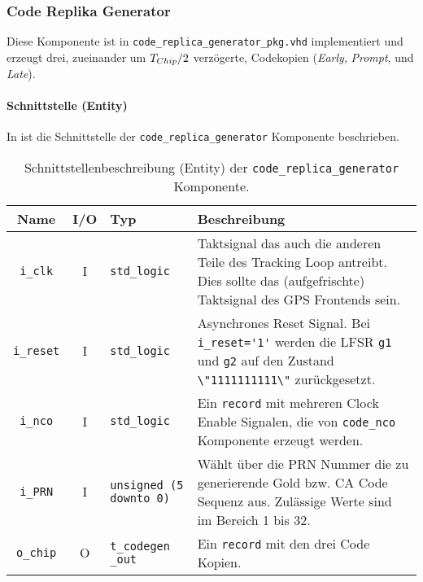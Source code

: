 \subsubsection{Code Replika Generator}
Diese Komponente ist in  \lstinline$code_replica_generator_pkg.vhd$ implementiert und erzeugt drei, zueinander um ${T}_{Chip} /2$ verzögerte, Codekopien (\emph{Early}, \emph{Prompt}, und \emph{Late}).

\paragraph{Schnittstelle (Entity)}
In  ist die Schnittstelle der \lstinline$code_replica_generator$ Komponente beschrieben.

\begin{table}[htbp]
    \ttabbox
    {
        \caption[Code Replika Generator Schnittstelle]{Schnittstellenbeschreibung (Entity) der \lstinline$code_replica_generator$ Komponente.}
        \label{TabCodeGen_Entity}
    }
    {
    \begin{tabular}{c c  p{2cm} p{6cm}}
        \toprule
        Name                    & I/O  & Typ                               & Beschreibung \\
        \midrule
        \lstinline$i_clk$       & I         & \lstinline$std_logic$             & Taktsignal das auch die anderen Teile des Tracking Loop antreibt. Dies sollte das (aufgefrischte) Taktsignal des GPS Frontends sein.\\
        \lstinline$i_reset$     & I         & \lstinline$std_logic$             & Asynchrones Reset Signal. Bei \lstinline$i_reset='1'$ werden die LFSR \lstinline$g1$ und \lstinline$g2$ auf den Zustand \lstinline$\"1111111111\"$ zurückgesetzt.\\
        \lstinline$i_nco$    & I         & \lstinline$std_logic$             & Ein \lstinline$record$ mit mehreren Clock Enable Signalen, die von \lstinline$code_nco$ Komponente erzeugt werden.\\
        \lstinline$i_PRN$       & I         & \lstinline$unsigned (5 downto 0)$ & Wählt über die PRN Nummer die zu generierende Gold bzw. \gls{CA} Code Sequenz aus. Zulässige Werte sind im Bereich 1 bis 32.\\
        \lstinline$o_chip$      & O         & \lstinline$t_codegen _out$             & Ein \lstinline$record$ mit den drei Code Kopien.\\
        \bottomrule
    \end{tabular}
}
\end{table}


